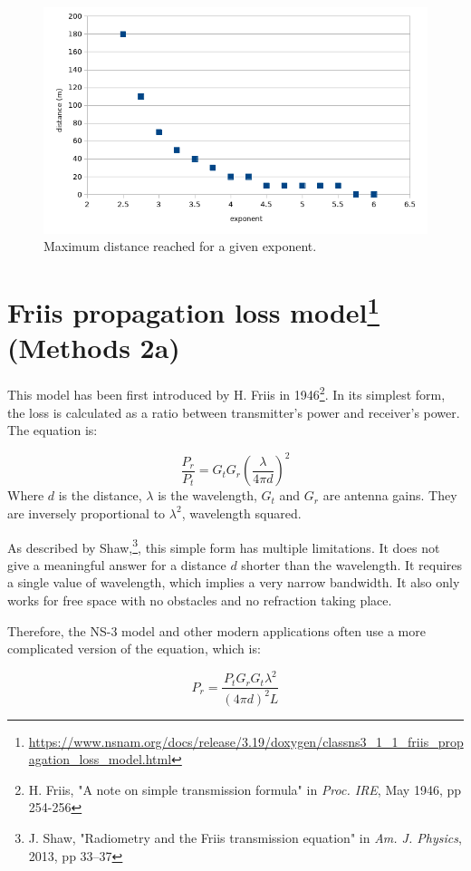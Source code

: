 \documentclass[11pt,journal]{article}
\begin{document}
	
	\begin{figure}[h]
		\centering
		\includegraphics[scale=0.6]{graph_log_exponent.png}
		\caption{Maximum distance reached for a given exponent.}
	\end{figure}
	
	\section{Friis propagation loss model\footnote{\url{https://www.nsnam.org/docs/release/3.19/doxygen/classns3_1_1_friis_propagation_loss_model.html}} (Methods 2a)}
	This model has been first introduced by H. Friis in 1946\footnote{H. Friis, "A note on simple transmission formula" in \emph{Proc. IRE}, May 1946, pp 254-256}. In its simplest form, the loss is calculated as a ratio between transmitter's power and receiver's power. The equation is:
	
	\[\frac{P_r}{P_t} = G_tG_r(\frac{\lambda}{4\pi d})^2  \]
	Where $d$ is the distance, $\lambda$ is the wavelength, $G_t$ and $G_r$ are antenna gains. They are inversely proportional to $\lambda ^2$, wavelength squared. 
		
	As described by Shaw,\footnote{J. Shaw, "Radiometry and the Friis transmission equation" in \emph{Am. J. Physics}, 2013, pp 33–37}, this simple form has multiple limitations. It does not give a meaningful answer for a distance $d$ shorter than the wavelength. It requires a single value of wavelength, which implies a very narrow bandwidth. It also only works for free space with no obstacles and no refraction taking place.
	
	Therefore, the NS-3 model and other modern applications often use a more complicated version of the equation, which is:
	
	\[P_r = \dfrac{P_tG_rG_t\lambda ^2}{(4\pi d)^2 L}\]
	
\end{document}
